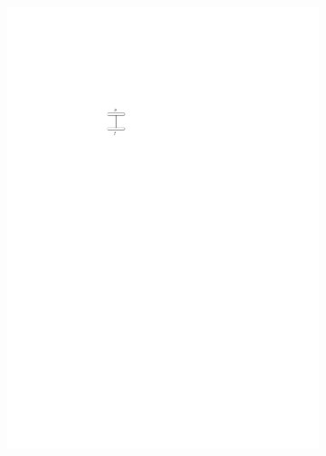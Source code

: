 \begin{description}
\begin{itemize}
\begin{figure}[H]
\begin{subfigure}{0.7\linewidth}
		\includegraphics[width=\textwidth,page=12]{drawings/2-trees.pdf}
		\caption{}
	\end{subfigure}
	\begin{subfigure}{0.7\linewidth}
	\centering

\end{subfigure}
\end{figure}
\end{itemize}
\end{description}
